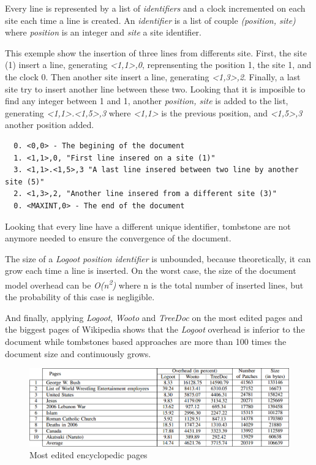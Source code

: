 \documentclass[11pt, a4paper]{article}
\begin{document}
 Every line is represented by a list of \emph{identifiers} and a clock incremented on each site each time a line is created. An \emph{identifier} is a list of couple \emph{(position, site)} where \emph{position} is an integer and \emph{site} a site identifier.

 This exemple show the insertion of three lines from differents site. First, the site (1) insert a line, generating \emph{<1,1>,0}, reprensenting the position 1, the site 1, and the clock 0. Then another site insert a line, generating \emph{<1,3>,2}. Finally, a last site try to insert another line between these two. Looking that it is imposible to find any integer between 1 and 1, another \emph{position, site} is added to the list, generating \emph{<1,1>.<1,5>,3} where \emph{<1,1>} is the previous position, and \emph{<1,5>,3} another position added. 
 \begin{verbatim}
  0. <0,0> - The begining of the document
  1. <1,1>,0, "First line insered on a site (1)"
  3. <1,1>.<1,5>,3 "A last line insered between two line by another site (5)" 
  2. <1,3>,2, "Another line insered from a different site (3)"
  0. <MAXINT,0> - The end of the document
 \end{verbatim}
 
 Looking that every line have a different unique identifier, tombstone are not anymore needed to ensure the convergence of the document.

 The size of a \emph{Logoot position identifier} is unbounded, because theoretically, it can grow each time a line is inserted. On the worst case, the size of the document model overhead can be \emph{O(n\textsuperscript{2})} where n is the total number of inserted lines, but the probability of this case is negligible.

 And finally, applying \emph{Logoot}, \emph{Wooto} and \emph{TreeDoc} on the most edited pages and the biggest pages of Wikipedia shows that the \emph{Logoot} overhead is inferior to the document while tombstones based approaches are more than 100 times the document size and continuously grows.

 \begin{figure}[h!]
  \includegraphics[width=1\textwidth]{includes/etu1}
  \caption{Most edited encyclopedic pages}
  \label{fig:etu1}
 \end{figure}
\end{document}
